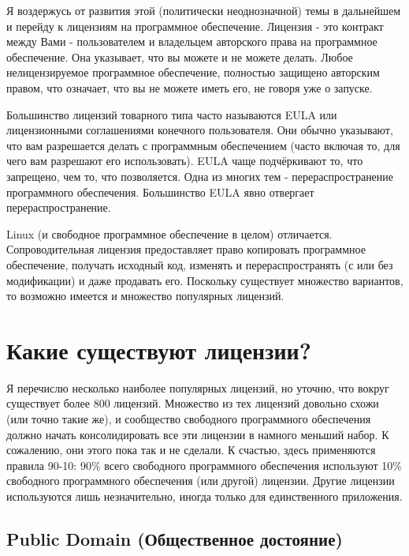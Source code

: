 \documentclass[10pt]{book}
\begin{document}
Я воздержусь от развития этой (политически неоднозначной) темы в дальнейшем и перейду к лицензиям на программное обеспечение. Лицензия - это контракт между Вами - пользователем и владельцем авторского права на программное обеспечение. Она указывает, что вы можете и не можете делать. Любое  нелицензируемое программное обеспечение, полностью защищено авторским правом, что означает, что вы не можете иметь его, не говоря уже о запуске.

Большинство лицензий товарного типа часто называются EULA или лицензионными соглашениями конечного пользователя. Они обычно указывают, что вам разрешается делать с программным обеспечением (часто включая то, для чего вам разрешают его использовать). EULA чаще подчёркивают то, что запрещено, чем то, что позволяется. Одна из многих тем - перераспространение программного обеспечения. Большинство EULA явно отвергает перераспространение.

Linux (и свободное программное обеспечение в целом) отличается. Сопроводительная лицензия предоставляет право копировать программное обеспечение, получать исходный код, изменять  и перераспространять (с или без модификации) и даже продавать его. Поскольку существует множество вариантов, то возможно имеется и множество популярных лицензий.

\section{Какие существуют лицензии?}

Я перечислю несколько наиболее популярных лицензий, но уточню, что вокруг существует более 800 лицензий. Множество из тех лицензий довольно схожи (или точно такие же), и сообщество свободного программного обеспечения должно начать консолидировать все  эти лицензии в намного меньший набор. К сожалению, они этого пока так и не сделали. К счастью, здесь применяются правила 90-10: 90\% всего свободного программного обеспечения используют 10\% свободного программного обеспечения (или другой) лицензии. Другие лицензии используются лишь незначительно, иногда только для единственного приложения.

\subsection{Public Domain (Общественное достояние)}

\end{document}
